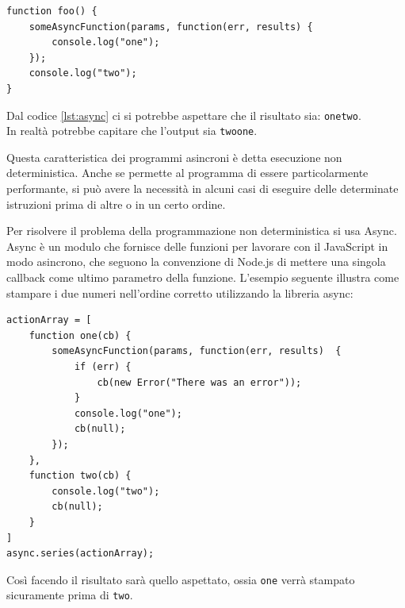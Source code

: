 \begin{lstlisting}[caption={operazioni asincrone}, style=javaScriptCode, label={lst:async}]
function foo() {
	someAsyncFunction(params, function(err, results) {
		console.log("one");
	});
	console.log("two");
}
\end{lstlisting}

Dal codice \ref{lst:async} ci si potrebbe aspettare che il risultato sia:
\texttt{onetwo}.\\
In realtà potrebbe capitare che l’output sia \texttt{twoone}.

Questa caratteristica dei programmi asincroni è detta esecuzione non deterministica. Anche se permette al programma di essere particolarmente performante, si può avere la necessità in alcuni casi di eseguire delle determinate istruzioni prima di altre o in un certo ordine.

Per risolvere il problema della programmazione non deterministica si usa Async.
Async è un modulo che fornisce delle funzioni per lavorare con il JavaScript in modo asincrono, che seguono la convenzione di Node.js di mettere una singola callback come ultimo parametro della funzione. 
\newpage
L'esempio seguente illustra come stampare i due numeri nell'ordine corretto utilizzando la libreria async:

\begin{lstlisting}[caption={operazioni sincrone}, style=javaScriptCode]
actionArray = [
	function one(cb) {
		someAsyncFunction(params, function(err, results)  {
			if (err) {
				cb(new Error("There was an error"));
			}
			console.log("one");
			cb(null);
		});
	},
	function two(cb) {
		console.log("two");
		cb(null);
	}
]
async.series(actionArray);
\end{lstlisting}

Così facendo il risultato sarà quello aspettato, ossia \texttt{one} verrà stampato sicuramente prima di \texttt{two}.